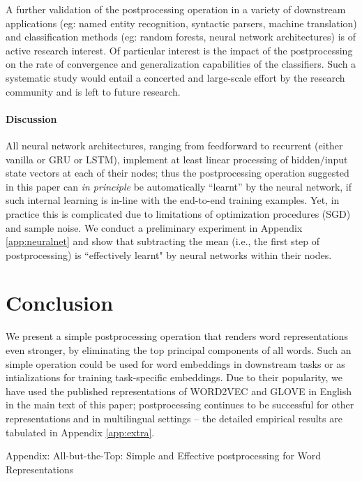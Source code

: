 \documentclass{article} \usepackage{acl2017,times}
\begin{document}
A further  validation of  the postprocessing operation in a variety of downstream applications (eg: named entity recognition, syntactic parsers, machine translation) and classification methods (eg: random forests, neural network architectures) is  of active research interest. Of particular  interest is the  impact of the postprocessing on the rate of convergence and generalization capabilities of the classifiers. Such a systematic study would entail a concerted and large-scale effort by the research community and is left to future research. 


{\paragraph{Discussion} All neural network architectures, ranging from  feedforward  to recurrent  (either  vanilla or GRU or LSTM),  implement at least  linear processing of  hidden/input state vectors at each of their nodes; thus  the postprocessing  operation  suggested in this paper  can {\em in principle} be  automatically ``learnt'' by the neural network, if such internal learning is in-line with the end-to-end training examples.  Yet, in practice this is complicated due to limitations of optimization procedures (SGD) and sample noise. We conduct a preliminary experiment in Appendix \ref{app:neuralnet} and show that subtracting the mean (i.e., the first step of postprocessing) is ``effectively learnt" by neural networks  within their nodes. 
}

\section{Conclusion}

We present a simple postprocessing operation that
renders word representations even stronger, by eliminating the top principal components of all words. Such an simple operation could be used for word embeddings in downstream tasks or as intializations for training task-specific embeddings.  
Due to their popularity, we have used the published representations of WORD2VEC and GLOVE in English in the main text of this paper; postprocessing continues to be successful for other representations and in multilingual settings -- the detailed empirical results are tabulated in Appendix \ref{app:extra}.







\newpage
\onecolumn
\begin{center}
  \Large Appendix: All-but-the-Top: Simple and Effective postprocessing for Word Representations
\end{center}
\end{document}
